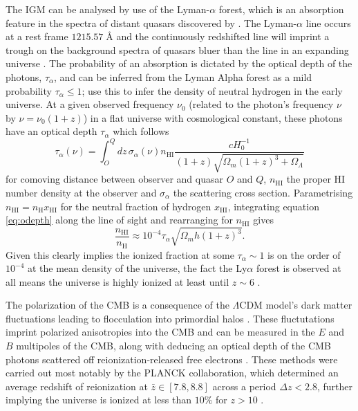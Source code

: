 \documentclass[fleqn,usenatbib]{mnras}
\begin{document}
The IGM can be analysed by use of the Lyman-$\alpha$ forest, which is an absorption feature in the spectra of distant quasars discovered by \cite{gunn_1965}. The Lyman-$\alpha$ line occurs at a rest frame $1215.57\;$\r{A} and the continuously redshifted line will imprint a trough on the background spectra of quasars bluer than the line in an expanding universe \citep{Rauch_1998}. The probability of an absorption is dictated by the optical depth of the photons, $\tau_{\alpha}$, and can be inferred from the Lyman Alpha forest as a mild probability $\tau_{\alpha}\leq1$; \cite{gunn_1965} use this to infer the density of neutral hydrogen in the early universe. At a given observed frequency $\nu_0$ (related to the photon's frequency $\nu$ by $\nu=\nu_0(1+z)$) in a flat universe with cosmological constant, these photons have an optical depth $\tau_{\alpha}$ which follows 
\begin{equation}
\label{eq:odepth}
    \tau_{\alpha}(\nu) = \int^Q_O dz\,\sigma_{\alpha}(\nu)n_{\mathrm{HI}} \frac{cH_0^{-1}}{(1+z)\sqrt{\Omega_m(1+z)^3+\Omega_{\Lambda}}}
\end{equation}
for comoving distance between observer and quasar $O$ and $Q$, $n_{\mathrm{HI}}$ the proper HI number density at the observer and $\sigma_{\alpha}$ the scattering cross section. Parametrising $n_{\mathrm{HI}}=n_{\mathrm{H}}x_{\mathrm{HI}}$ for the neutral fraction of hydrogen $x_{\mathrm{HI}}$, integrating equation \eqref{eq:odepth} along the line of sight and rearranging for $n_{\mathrm{HI}}$ gives
\begin{equation}
    \frac{n_{\mathrm{HI}}}{n_{\mathrm{H}}}\approx10^{-4}\tau_\alpha\sqrt{\Omega_mh(1+z)^3}.
\end{equation}
Given this clearly implies the ionized fraction at some $\tau_\alpha\sim1$ is on the order of $10^{-4}$ at the mean density of the universe, the fact the Ly$\alpha$ forest is observed at all means the universe is highly ionized at least until $z\sim6$ \citep{zaroubi}. 

The polarization of the CMB is a consequence of the $\Lambda$CDM model's dark matter fluctuations leading to flocculation into primordial halos \citep{Hu_1997}. These fluctutations imprint polarized anisotropies into the CMB and can be measured in the $E$ and $B$ multipoles of the CMB, along with deducing an optical depth of the CMB photons scattered off reionization-released free electrons \citep{bond_1984,Hu_1997}. These methods were carried out most notably by the PLANCK collaboration, which determined an average redshift of reionization at $\bar{z}\in[7.8,8.8]$ across a period $\Delta z<2.8$, further implying the universe is ionized at less than $10\%$ for $z>10$ \citep{planck_2016}.
\end{document}
